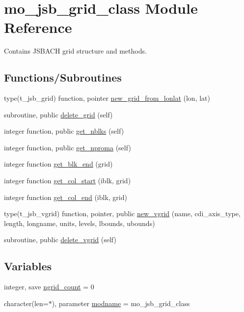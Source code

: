 \hypertarget{namespacemo__jsb__grid__class}{}\section{mo\+\_\+jsb\+\_\+grid\+\_\+class Module Reference}
\label{namespacemo__jsb__grid__class}


Contains J\+S\+B\+A\+C\+H grid structure and methods.  


\subsection*{Functions/\+Subroutines}
\begin{DoxyCompactItemize}
\item 
type(t\+\_\+jsb\+\_\+grid) function, pointer \hyperlink{namespacemo__jsb__grid__class_a2ed0d23521e0ed882dd496dc097e941f}{new\+\_\+grid\+\_\+from\+\_\+lonlat} (lon, lat)
\item 
subroutine, public \hyperlink{namespacemo__jsb__grid__class_a8eff8482b9f6dc02b8c703f80f962b8c}{delete\+\_\+grid} (self)
\item 
integer function, public \hyperlink{namespacemo__jsb__grid__class_a1f7b1d1bbf7523458be54c335a83f423}{get\+\_\+nblks} (self)
\item 
integer function, public \hyperlink{namespacemo__jsb__grid__class_a42ff42d4dc8ff6d34bc68cde0d2c9006}{get\+\_\+nproma} (self)
\item 
integer function \hyperlink{namespacemo__jsb__grid__class_afc8f2ee4e73381a9ff8eb402d89c4eee}{get\+\_\+blk\+\_\+end} (grid)
\item 
integer function \hyperlink{namespacemo__jsb__grid__class_a1a350aded77ade355944cec2a0d972f1}{get\+\_\+col\+\_\+start} (iblk, grid)
\item 
integer function \hyperlink{namespacemo__jsb__grid__class_affffc8eaeee7b83491f39d21150f2c78}{get\+\_\+col\+\_\+end} (iblk, grid)
\item 
type(t\+\_\+jsb\+\_\+vgrid) function, pointer, public \hyperlink{namespacemo__jsb__grid__class_a9b97575796bec8269c7381e0ffedd2d8}{new\+\_\+vgrid} (name, cdi\+\_\+axis\+\_\+type, length, longname, units, levels, lbounds, ubounds)
\item 
subroutine, public \hyperlink{namespacemo__jsb__grid__class_a14a5dddab870a130135f43b849588a3f}{delete\+\_\+vgrid} (self)
\end{DoxyCompactItemize}
\subsection*{Variables}
\begin{DoxyCompactItemize}
\item 
integer, save \hyperlink{namespacemo__jsb__grid__class_ad64217c2b3f2f8da3c4b7297bc650ae4}{ngrid\+\_\+count} = 0
\item 
character(len=$\ast$), parameter \hyperlink{namespacemo__jsb__grid__class_a2d6c1334c4fbe274a9f0b7acd6fd6361}{modname} = \textquotesingle{}mo\+\_\+jsb\+\_\+grid\+\_\+class\textquotesingle{}
\end{DoxyCompactItemize}


